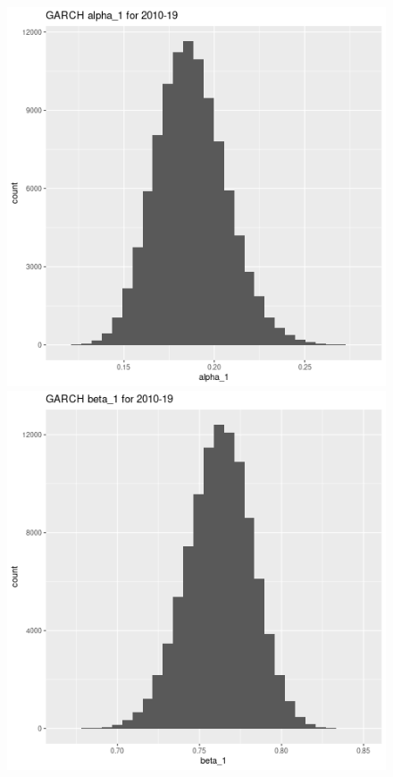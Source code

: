 \documentclass[12pt,letterpaper,reqno,fleqn]{article}
\begin{document}
\begin{figure}
\includegraphics[scale = .4]{ga11019}
\includegraphics[scale = .4]{gb11019}

\end{figure}
\end{document}
